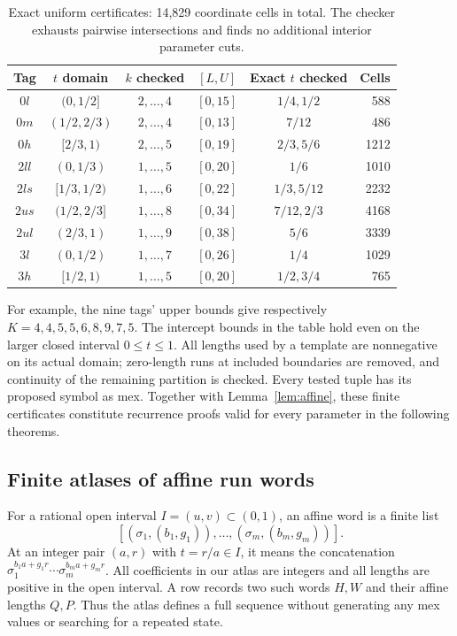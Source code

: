 \documentclass[11pt]{article}
\theoremstyle{remark}\newtheorem{remark}[theorem]{Remark}
\begin{document}
\begin{table}[ht]\centering\small
\begin{tabular}{c|c|c|c|c|r}\toprule
Tag & $t$ domain & $k$ checked & $[L,U]$ & Exact $t$ checked & Cells\\\midrule
$0l$&$(0,1/2]$&$2,\ldots,4$&$[0,15]$&$1/4,1/2$&588\\
$0m$&$(1/2,2/3)$&$2,\ldots,4$&$[0,13]$&$7/12$&486\\
$0h$&$[2/3,1)$&$2,\ldots,5$&$[0,19]$&$2/3,5/6$&1212\\
$2ll$&$(0,1/3)$&$1,\ldots,5$&$[0,20]$&$1/6$&1010\\
$2ls$&$[1/3,1/2)$&$1,\ldots,6$&$[0,22]$&$1/3,5/12$&2232\\
$2us$&$(1/2,2/3]$&$1,\ldots,8$&$[0,34]$&$7/12,2/3$&4168\\
$2ul$&$(2/3,1)$&$1,\ldots,9$&$[0,38]$&$5/6$&3339\\
$3l$&$(0,1/2)$&$1,\ldots,7$&$[0,26]$&$1/4$&1029\\
$3h$&$[1/2,1)$&$1,\ldots,5$&$[0,20]$&$1/2,3/4$&765\\\bottomrule
\end{tabular}
\caption{Exact uniform certificates: 14,829 coordinate cells in total. The checker exhausts pairwise intersections and finds no additional interior parameter cuts.}\label{tab:uniform}
\end{table}
For example, the nine tags' upper bounds give respectively $K=4,4,5,5,6,8,9,7,5$. The intercept bounds in the table hold even on the larger closed interval $0\le t\le1$. All lengths used by a template are nonnegative on its actual domain; zero-length runs at included boundaries are removed, and continuity of the remaining partition is checked. Every tested tuple has its proposed symbol as mex. Together with Lemma~\ref{lem:affine}, these finite certificates constitute recurrence proofs valid for every parameter in the following theorems.


\subsection{Finite atlases of affine run words}\label{sec:atlas-method}
For a rational open interval $I=(u,v)\subset(0,1)$, an affine word is a finite list
\[
[(\sigma_1,(b_1,g_1)),\ldots,(\sigma_m,(b_m,g_m))].
\]
At an integer pair $(a,r)$ with $t=r/a\in I$, it means the concatenation $\sigma_1^{b_1a+g_1r}\cdots\sigma_m^{b_ma+g_mr}$. All coefficients in our atlas are integers and all lengths are positive in the open interval. A row records two such words $H,W$ and their affine lengths $Q,P$. Thus the atlas defines a full sequence without generating any mex values or searching for a repeated state.
\end{document}
